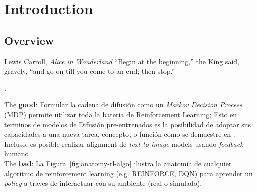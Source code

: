 \chapter{Introduction}

\section{Overview}

\begin{chapquote}{Lewis Carroll, \textit{Alice in Wonderland}}
``Begin at the beginning,'' the King said, gravely, ``and go on till you come to an end; then stop.''
\end{chapquote}


.

The \textbf{good}: Formular la cadena de difusión como un \textit{Markov Decision Process} (MDP) permite utilizar toda la bateria de Reinforcement Learning; Esto en terminos de modelos de Difusión pre-entrenados es la posibilidad de adoptar sus capacidades a una nueva tarea, concepto, o función como se demuestre en \cite{black2023training}. Incluso, es posible realizar alignment de \textit{text-to-image} models usando \textit{feedback} humano \cite{ouyang2022training}. \\

The \textbf{bad}: La Figura~\ref{fig:anatomy-rl-algo} ilustra la anatomía de cualquier algoritmo de reinforcement learning (e.g. REINFORCE, DQN) para aprender un \textit{policy} a traves de interactuar con su ambiente (real o simulado). \\



